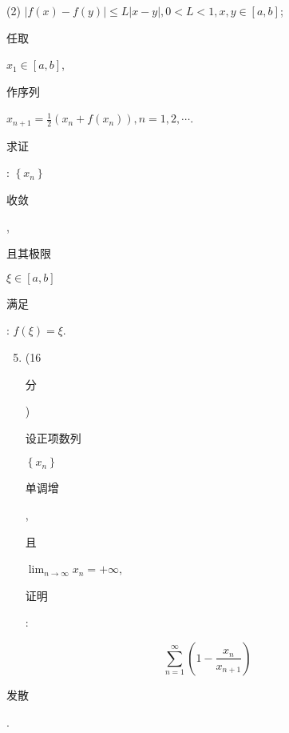 \documentclass[10pt]{article}
\begin{document}
(2) $|f(x)-f(y)| \leq L|x-y|, 0<L<1, x, y \in[a, b]$;

\begin{CJK}{UTF8}{mj}任取\end{CJK} $x_{1} \in[a, b]$, \begin{CJK}{UTF8}{mj}作序列\end{CJK} $x_{n+1}=\frac{1}{2}\left(x_{n}+f\left(x_{n}\right)\right), n=1,2, \cdots$. \begin{CJK}{UTF8}{mj}求证\end{CJK}: $\left\{x_{n}\right\}$ \begin{CJK}{UTF8}{mj}收敛\end{CJK}, \begin{CJK}{UTF8}{mj}且其极限\end{CJK} $\xi \in[a, b]$ \begin{CJK}{UTF8}{mj}满足\end{CJK}: $f(\xi)=\xi$.

\begin{enumerate}
  \setcounter{enumi}{4}
  \item (16 \begin{CJK}{UTF8}{mj}分\end{CJK}) \begin{CJK}{UTF8}{mj}设正项数列\end{CJK} $\left\{x_{n}\right\}$ \begin{CJK}{UTF8}{mj}单调增\end{CJK}, \begin{CJK}{UTF8}{mj}且\end{CJK} $\lim _{n \rightarrow \infty} x_{n}=+\infty$, \begin{CJK}{UTF8}{mj}证明\end{CJK}:
\end{enumerate}
$$
\sum_{n=1}^{\infty}\left(1-\frac{x_{n}}{x_{n+1}}\right)
$$
\begin{CJK}{UTF8}{mj}发散\end{CJK}.
\end{document}
